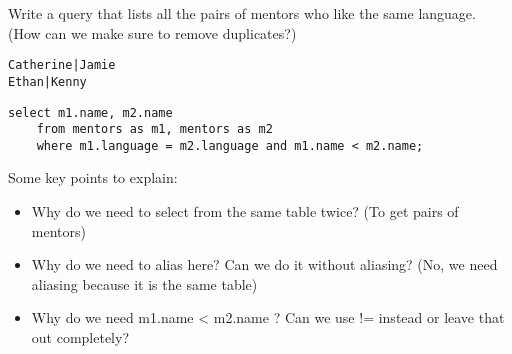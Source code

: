 \begin{blocksection}
\question Write a query that lists all the pairs of mentors who like the same language. (How can we make sure to remove duplicates?)

\begin{lstlisting}
Catherine|Jamie
Ethan|Kenny
\end{lstlisting}

\begin{solution}
\begin{lstlisting}
select m1.name, m2.name
    from mentors as m1, mentors as m2
    where m1.language = m2.language and m1.name < m2.name;
\end{lstlisting}
\end{solution}
\end{blocksection}

\begin{guide}
\begin{blocksection}
Some key points to explain:
\begin{itemize}
	\item Why do we need to select from the same table twice? (To get pairs of mentors)
	\item Why do we need to alias here? Can we do it without aliasing? (No, we need aliasing because it is the same table)
	\item Why do we need m1.name < m2.name ? Can we use != instead or leave that out completely?
\end{itemize}
\end{blocksection}
\end{guide}
